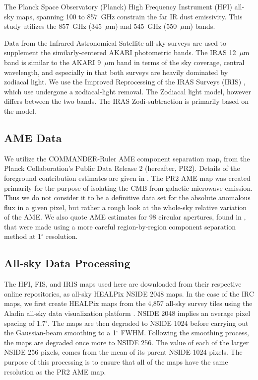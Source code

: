 \documentclass[preprint2,longabstract]{aastex}
\begin{document}
     The Planck Space Observatory (Planck) High Frequency Instrument (HFI) all-sky maps, spanning 100 to 857~GHz \citep{hfi14viii} constrain the far IR dust emissivity. This study utilizes the 857~GHz (345~$\mu$m) and 545~GHz (550~$\mu$m) bands.

     Data from the Infrared Astronomical Satellite \citep{iras84} all-sky surveys are used to supplement the similarly-centered AKARI photometric bands. The IRAS 12~$\mu$m band is similar to the AKARI 9~$\mu$m band in terms of the sky coverage, central wavelength, and especially in that both surveys are heavily dominated by zodiacal light. We use the Improved Reprocessing of the IRAS Surveys (IRIS) \citep{iris05}, which use undergone a zodiacal-light removal. The Zodiacal light model, however differs between the two bands. The IRAS Zodi-subtraction is primarily based on the \cite{kelsall98} model.

\subsection{AME Data}

     We utilize the COMMANDER-Ruler AME component separation map, from the Planck Collaboration's Public Data Release 2 (hereafter, PR2). Details of the foreground contribution estimates are given in \cite{planckXII}. The PR2 AME map was created primarily for the purpose of isolating the CMB from galactic microwave emission. Thus we do not consider it to be a definitive data set for the absolute anomalous flux in a given pixel, but rather a rough look at the whole-sky relative variation of the AME. We also quote AME estimates for 98 circular apertures, found in \cite{planckXV}, that were made using a more careful region-by-region component separation method at 1$^{\circ}$ resolution.

\subsection{All-sky Data Processing}

      The HFI, FIS, and IRIS maps used here are downloaded from their respective online repositories, as all-sky HEALPix \citep{gorski15} NSIDE 2048 maps. In the case of the IRC maps, we first create HEALPix maps from the 4,857 all-sky survey tiles using the Aladin all-sky data visualization platform \citep{bonnarel00}. NSIDE 2048 implies an average pixel spacing of 1.7$'$. The maps are then degraded to NSIDE 1024 before carrying out the Gaussian-beam smoothing to a 1$^{\circ}$ FWHM. Following the smoothing process, the maps are degraded once more to NSIDE 256. The value of each of the larger NSIDE 256 pixels, comes from the mean of its parent NSIDE 1024 pixels. The purpose of this processing is to ensure that all of the maps have the same resolution as the PR2 AME map.
\end{document}
